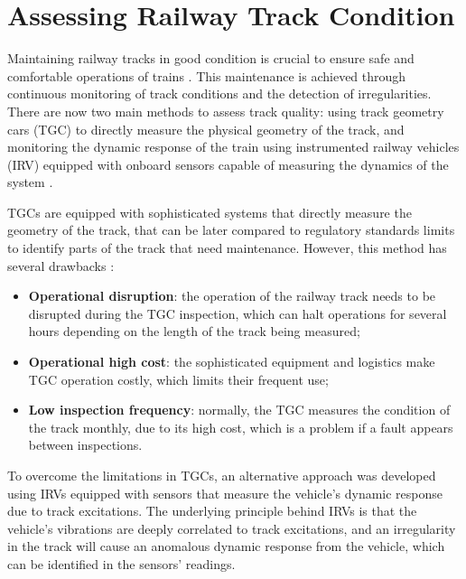 \section{Assessing Railway Track Condition} \label{sec-assessing-railway-track}

Maintaining railway tracks in good condition is crucial to ensure safe and comfortable operations of trains \cite{Tsunashima-2019,GHIASI2025109516}. This maintenance is achieved through continuous monitoring of track conditions and the detection of irregularities. There are now two main methods to assess track quality: using track geometry cars (TGC) to directly measure the physical geometry of the track, and monitoring the dynamic response of the train using instrumented railway vehicles (IRV) equipped with onboard sensors capable of measuring the dynamics of the system \cite{PIRES2024107191}.

TGCs are equipped with sophisticated systems that directly measure the geometry of the track, that can be later compared to regulatory standards limits to identify parts of the track that need maintenance. However, this method has several drawbacks \cite{PIRES2024107191,GHIASI2025109516,Hironori_ONO202322-00239}:
\begin{itemize}
    \item \textbf{Operational disruption}: the operation of the railway track needs to be disrupted during the TGC inspection, which can halt operations for several hours depending on the length of the track being measured;
    \item \textbf{Operational high cost}: the sophisticated equipment and logistics make TGC operation costly, which limits their frequent use;
    \item \textbf{Low inspection frequency}: normally, the TGC measures the condition of the track monthly, due to its high cost, which is a problem if a fault appears between inspections.
\end{itemize}

To overcome the limitations in TGCs, an alternative approach was developed using IRVs equipped with sensors that measure the vehicle's dynamic response due to track excitations. The underlying principle behind IRVs is that the vehicle's vibrations are deeply correlated to track excitations, and an irregularity in the track will cause an anomalous dynamic response from the vehicle, which can be identified in the sensors' readings.

